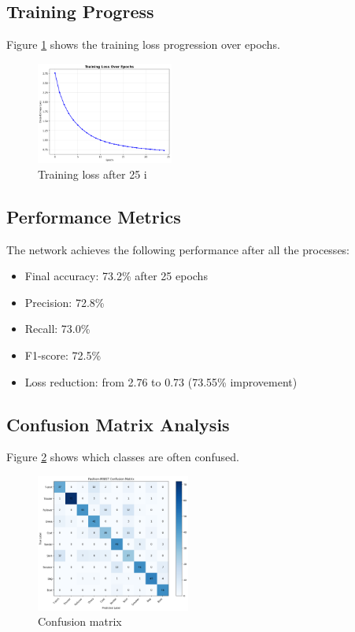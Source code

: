 \documentclass[conference]{IEEEtran}
\begin{document}
\subsection{Training Progress}
Figure \ref{fig:training_loss} shows the training loss progression over epochs.

\begin{figure}[H]
    \centering
    \includegraphics[width=0.4\textwidth]{training_loss.png}
    \caption{Training loss after 25 i}
    \label{fig:training_loss}
\end{figure}

\subsection{Performance Metrics}
The network achieves the following performance after all the processes:
\begin{itemize}
    \item Final accuracy: 73.2\% after 25 epochs
    \item Precision: 72.8\%
    \item Recall: 73.0\%
    \item F1-score: 72.5\%
    \item Loss reduction: from 2.76 to 0.73 (73.55\% improvement)
\end{itemize}

\subsection{Confusion Matrix Analysis}
Figure \ref{fig:confusion} shows which classes are often confused.

\begin{figure}[htbp]
    \centering
    \includegraphics[width=0.45\textwidth]{confusion_matrix.png}
    \caption{Confusion matrix}
    \label{fig:confusion}
\end{figure}
\end{document}
